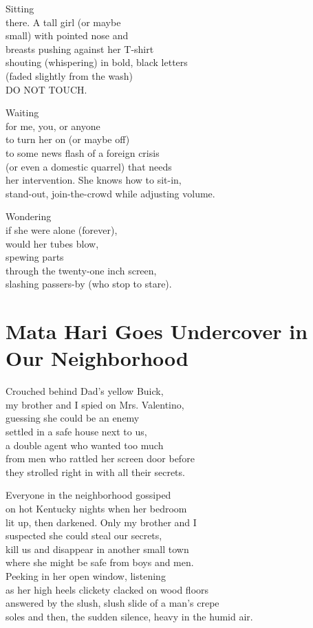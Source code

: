 \documentclass[twoside,10pt]{book}
\begin{document}
Sitting\\
there. A tall girl (or maybe\\
small) with pointed nose and\\
breasts pushing against her T-shirt\\
shouting (whispering) in bold, black letters\\
(faded slightly from the wash)\\
DO NOT TOUCH.

Waiting\\
for me, you, or anyone\\
to turn her on (or maybe off)\\
to some news flash of a foreign crisis\\
(or even a domestic quarrel) that needs\\
her intervention. She knows how to sit-in,\\
stand-out, join-the-crowd while adjusting volume.

Wondering\\
if she were alone (forever),\\
would her tubes blow,\\
spewing parts\\
through the twenty-one inch screen,\\
slashing passers-by (who stop to stare).


\clearpage
\section{Mata Hari Goes Undercover in Our Neighborhood}

Crouched behind Dad's yellow Buick,\\
my brother and I spied on Mrs. Valentino,\\
guessing she could be an enemy\\
settled in a safe house next to us,\\
a double agent who wanted too much\\
from men who rattled her screen door before\\
they strolled right in with all their secrets.

Everyone in the neighborhood gossiped\\
on hot Kentucky nights when her bedroom\\
lit up, then darkened. Only my brother and I\\
suspected she could steal our secrets,\\
kill us and disappear in another small town\\
where she might be safe from boys and men.\\
Peeking in her open window, listening\\
as her high heels clickety clacked on wood floors\\
answered by the slush, slush slide of a man's crepe\\
soles and then, the sudden silence, heavy in the humid air.
\end{document}
